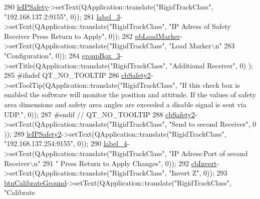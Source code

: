 \begin{DoxyCode}
280         \hyperlink{class_ui___rigid_track_class_af722611603b357175b3ce505bdf468b1}{leIPSafety}->setText(QApplication::translate(\textcolor{stringliteral}{"RigidTrackClass"}, \textcolor{stringliteral}{"192.168.137.2:9155"}, 0));
281         \hyperlink{class_ui___rigid_track_class_a40dc760bee515c66ebe81f67b2d7f5f9}{label\_3}->setText(QApplication::translate(\textcolor{stringliteral}{"RigidTrackClass"}, \textcolor{stringliteral}{"IP Adress of Safety Receiver
       Press Return to Apply"}, 0));
282         \hyperlink{class_ui___rigid_track_class_a76c00d83ae38b7eaa03ef28c280631fa}{pbLoadMarker}->setText(QApplication::translate(\textcolor{stringliteral}{"RigidTrackClass"}, \textcolor{stringliteral}{"Load Marker\(\backslash\)n"}
283 \textcolor{stringliteral}{"Configuration"}, 0));
284         \hyperlink{class_ui___rigid_track_class_a822d802011c4868603863fa70f5589ae}{groupBox\_3}->setTitle(QApplication::translate(\textcolor{stringliteral}{"RigidTrackClass"}, \textcolor{stringliteral}{"Additional Receiver"}, 0)
      );
285 \textcolor{preprocessor}{#ifndef QT\_NO\_TOOLTIP}
286         \hyperlink{class_ui___rigid_track_class_a1e5273e53cb1276c8c056f1da4e72910}{cbSafety2}->setToolTip(QApplication::translate(\textcolor{stringliteral}{"RigidTrackClass"}, \textcolor{stringliteral}{"If this check box is
       enabled the software will monitor the position and attitude. If the values of safety area dimensions and safety
       area angles are exceeded a disable signal is sent via UDP."}, 0));
287 \textcolor{preprocessor}{#endif // QT\_NO\_TOOLTIP}
288         \hyperlink{class_ui___rigid_track_class_a1e5273e53cb1276c8c056f1da4e72910}{cbSafety2}->setText(QApplication::translate(\textcolor{stringliteral}{"RigidTrackClass"}, \textcolor{stringliteral}{"Send to second Receiver"}, 0
      ));
289         \hyperlink{class_ui___rigid_track_class_a70522f29594cbdc654ffed858b3e1fc5}{leIPSafety2}->setText(QApplication::translate(\textcolor{stringliteral}{"RigidTrackClass"}, \textcolor{stringliteral}{"192.168.137.254:9155"}, 
      0));
290         \hyperlink{class_ui___rigid_track_class_aa8e51b4d3909b5d36d9d64961d2648a3}{label\_4}->setText(QApplication::translate(\textcolor{stringliteral}{"RigidTrackClass"}, \textcolor{stringliteral}{"IP Adress:Port of second
       Receiver\(\backslash\)n"}
291 \textcolor{stringliteral}{" Press Return to Apply Changes"}, 0));
292         \hyperlink{class_ui___rigid_track_class_a370014fb6d177a07220b69155b4c101b}{cbInvert}->setText(QApplication::translate(\textcolor{stringliteral}{"RigidTrackClass"}, \textcolor{stringliteral}{"Invert Z"}, 0));
293         \hyperlink{class_ui___rigid_track_class_a7497d27bfd5a03243079fdb055291264}{btnCalibrateGround}->setText(QApplication::translate(\textcolor{stringliteral}{"RigidTrackClass"}, \textcolor{stringliteral}{"Calibrate
}
\end{DoxyCode}
